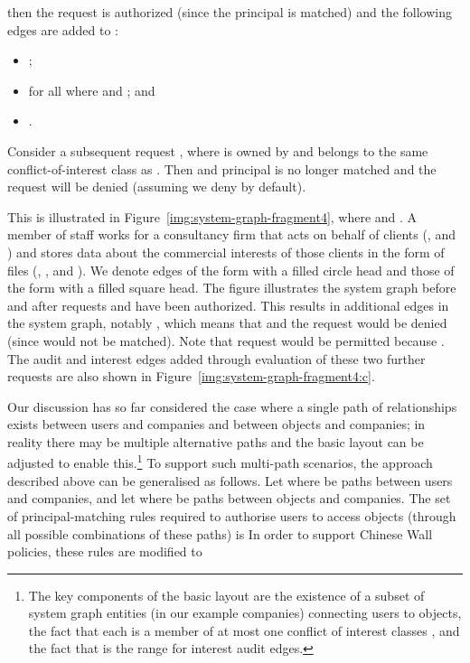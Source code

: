 \documentclass{article}
\begin{document}
then the request is authorized (since the principal  is matched) and the following edges are added to :
\begin{itemize}
 \item ;
 \item  for all  where  and ; and
 \item .
\end{itemize}
Consider a subsequent request , where  is owned by  and  belongs to the same conflict-of-interest class as .
Then  and principal  is no longer matched and the request will be denied (assuming we deny by default).

This is illustrated in Figure~\ref{img:system-graph-fragment4}, where  and .
A member of staff  works for a consultancy firm  that acts on behalf of clients (,  and ) and stores data about the commercial interests of those clients in the form of files (, ,  and ).
We denote edges of the form  with a filled circle head and those of the form  with a filled square head.
The figure illustrates the system graph before and after requests  and  have been authorized.
This results in additional edges in the system graph, notably , which means that  and the request  would be denied (since  would not be matched).
Note that request  would be permitted because .
The audit and interest edges added through evaluation of these two further requests are also shown in Figure~\ref{img:system-graph-fragment4:c}.

Our discussion has so far considered the case where a single path of relationships exists between users and companies and between objects and companies; in reality there may be multiple alternative paths and the basic layout can be adjusted to enable this.\footnote{The key components of the basic layout are the existence of a subset of system graph entities  (in our example companies) connecting users to objects, the fact that each  is a member of at most one conflict of interest classes , and the fact that  is the range for interest audit edges.}
To support such multi-path scenarios, the approach described above can be generalised as follows.
Let  where  be paths between users and companies, and let  where  be paths between objects and companies.
The set of principal-matching rules required to authorise users to access objects (through all possible combinations of these paths) is 
In order to support Chinese Wall policies, these rules are modified to
\end{document}
